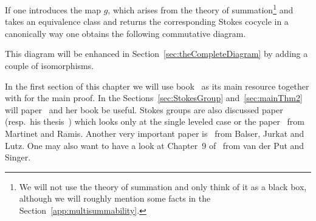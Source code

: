 If one introduces the map $g$, which arises from the theory of
summation\footnote{We will not use the theory of summation and only think of it
  as a black box, although we will roughly mention some facts in the
  Section~\ref{app:multisummability}.} and takes an equivalence
class and returns the corresponding Stokes cocycle in a canonically way one
obtains the following commutative diagram.
\begin{center}
\end{center}\label{page:ofPreDiagram}
This diagram will be enhanced in Section~\ref{sec:theCompleteDiagram} by
adding a couple of isomorphisms.

In the first section of this chapter we will use
 book~\cite[section II]{sabbah2007isomonodromic} as its main
resource together with \cite{babbitt1989local} for the main proof.
In the Sections~\ref{sec:StokesGroup} and~\ref{sec:mainThm2} will
 paper~\cite{Loday1994} and her book
\cite[Sec.4]{Loday2014} be useful.
Stokes groups are also discussed  paper~\cite{boalch} (resp.\
his thesis~\cite{thboalch}) which looks only at the single leveled case or the
paper~\cite{Martinet1991} from Martinet and Ramis.
Another very important paper is~\cite{BJL1979Birkhoff} from Balser, Jurkat and
Lutz.
One may also want to have a look at Chapter~9 of~\cite{van2003galois} from van
der Put and Singer.

